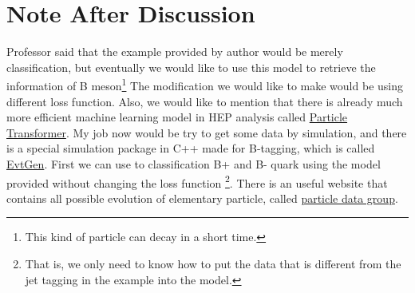 \documentclass[12pt]{article}
\numberwithin{equation}{section}
\begin{document}
\section{Note After Discussion}

Professor said that the example provided by author would be merely classification, but eventually we would like to use this model to retrieve the information of B meson\footnote{This kind of particle can decay in a short time.}
The modification we would like to make would be using different loss function. 
Also, we would like to mention that there is already much more efficient machine learning model in HEP analysis called \href{https://github.com/jet-universe/particle_transformer}{Particle Transformer}.
My job now would be try to get some data by simulation, and there is a special simulation package in C++ made for B-tagging, which is called \href{https://evtgen.hepforge.org/}{EvtGen}.
First we can use to classification B+ and B- quark using the model provided without changing the loss function
\footnote{That is, we only need to know how to put the data that is different from the jet tagging in the example into the model.}.
There is an useful website that contains all possible evolution of elementary particle, called \href{https://pdglive.lbl.gov/Viewer.action}{particle data group}.
\end{document}
